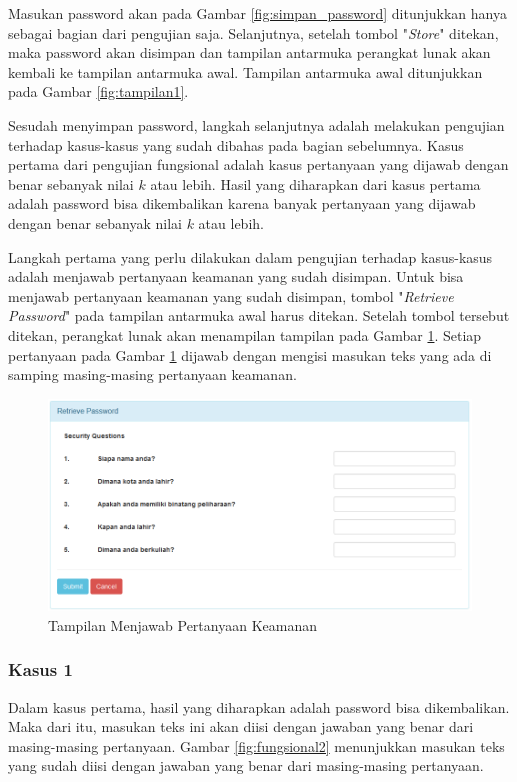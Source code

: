 Masukan password akan pada Gambar \ref{fig:simpan_password} ditunjukkan hanya sebagai bagian dari pengujian saja. Selanjutnya, setelah tombol "\textit{Store}" ditekan, maka password akan disimpan dan tampilan antarmuka perangkat lunak akan kembali ke tampilan antarmuka awal. Tampilan antarmuka awal ditunjukkan pada Gambar \ref{fig:tampilan1}.

Sesudah menyimpan password, langkah selanjutnya adalah melakukan pengujian terhadap kasus-kasus yang sudah dibahas pada bagian sebelumnya. Kasus pertama dari pengujian fungsional adalah kasus pertanyaan yang dijawab dengan benar sebanyak nilai $k$ atau lebih. Hasil yang diharapkan dari kasus pertama adalah password bisa dikembalikan karena banyak pertanyaan yang dijawab dengan benar sebanyak nilai $k$ atau lebih.

Langkah pertama yang perlu dilakukan dalam pengujian terhadap kasus-kasus adalah menjawab pertanyaan keamanan yang sudah disimpan. Untuk bisa menjawab pertanyaan keamanan yang sudah disimpan, tombol "\textit{Retrieve Password}" pada tampilan antarmuka awal harus ditekan. Setelah tombol tersebut ditekan, perangkat lunak akan menampilan tampilan pada Gambar \ref{fig:fungsional1}. Setiap pertanyaan pada Gambar \ref{fig:fungsional1} dijawab dengan mengisi masukan teks yang ada di samping masing-masing pertanyaan keamanan.

\begin{figure}[h]
	\includegraphics[scale=0.6]{Gambar/fungsional1}
	\centering
	\caption{Tampilan Menjawab Pertanyaan Keamanan}\label{fig:fungsional1}
\end{figure}

\subsubsection{Kasus 1}

Dalam kasus pertama, hasil yang diharapkan adalah password bisa dikembalikan. Maka dari itu, masukan teks ini akan diisi dengan jawaban yang benar dari masing-masing pertanyaan. Gambar \ref{fig:fungsional2} menunjukkan masukan teks yang sudah diisi dengan jawaban yang benar dari masing-masing pertanyaan.


